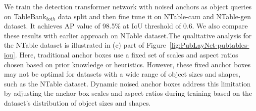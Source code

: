\documentclass[sn-mathphys]{sn-jnl}\jyear{2021}\theoremstyle{thmstyleone}\newtheorem{theorem}{Theorem}\newtheorem{proposition}[theorem]{Proposition}\theoremstyle{thmstyletwo}\newtheorem{example}{Example}\newtheorem{remark}{Remark}\theoremstyle{thmstylethree}\newtheorem{definition}{Definition}\usepackage{amsmath}
\begin{document}
We train the detection transformer network with noised anchors as object queries on TableBank$_{both}$ data split and then fine tune it on NTable-cam and NTable-gen dataset. It achieves AP value of 98.5$\%$ at IoU threshold of 0.6. We also compare these results with earlier approach on NTable dataset.The qualitative analysis for the NTable dataset is illustrated in (c) part
of Figure~\ref{fig:PubLayNet-pubtables-iou}. Here, traditional anchor boxes use a fixed set of scales and aspect ratios chosen based on prior knowledge or heuristics. However, these fixed anchor boxes may not be optimal for datasets with a wide range of object sizes and shapes, such as the NTable dataset. Dynamic noised anchor boxes address this limitation by adjusting the anchor box scales and aspect ratios during training based on the dataset's distribution of object sizes and shapes.
\end{document}
